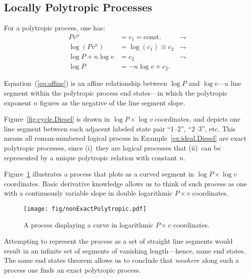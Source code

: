 \documentclass[fleqn,11pt]{SelfArx}
\begin{document}
    \subsection{Locally Polytropic Processes}

    For a polytropic process, one has: %
    \begin{align}
        Pv^n & = c_1 = \text{const.}        & \rightharpoondown\\
        \log(Pv^n) & = \log(c_1) \equiv c_2 & \rightharpoondown\\
        \log P + n\log v & = c_2            & \rightharpoondown\\
        \log P & = -n\log v + c_2. \label{eq:affine}
    \end{align}

    Equation~(\ref{eq:affine}) is an affine relationship between $\log P$ and $\log v$---a  line
    segment within the polytropic process end states---in  which  the  polytropic  exponent  $n$
    figures as the negative of the line segment slope.

    Figure~\ref{fig:cycle.Diesel} is drawn in $\log P \times \log v$  coordinates,  and  depicts
    one line segment between each adjacent labeled state  pair  ``1--2'',  ``2--3'',  etc.  This
    means  all  roman-numbered  logical  process  in  Example~\ref{ex:ideal.Diesel}  are   exact
    polytropic processes, since (i)~they are logical processes that (ii)~can be represented by a
    unique polytropic relation with constant $n$.

    Figure~\ref{fig:non.exact} illustrates a process that plots as a curved segment in  $\log  P
    \times \log v$ coordinates. Basic derivative knowledge allows us to think of such process as
    one with a continuously variable slope in double logarithmic $P\times v$ coordinates.

    \begin{figure}[ht]
        \centering
        \texttt{[image: fig/nonExactPolytropic.pdf]}
        \caption{A process displaying a curve in logarithmic $P\times v$ coordinates.}
        \label{fig:non.exact}
    \end{figure}

    Attempting to represent the process as a set of straight line segments would  result  in  an
    infinite set of segments of vanishing length---hence, same end states. The same  end  states
    theorem allows us to conclude that \emph{nowhere} along such a process one  finds  an  exact
    polytropic process.
\end{document}
